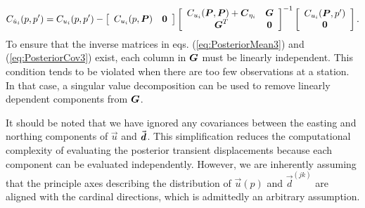 \documentclass[extra,mreferee]{gji}
\begin{document}
\begin{equation}\label{eq:PosteriorCov3}
C_{\post_i}(p,p') = C_{u_i}(p,p') - 
                    \left[\begin{array}{cc}
                          C_{u_i}(p,\points) & \zeros \\
                          \end{array}\right]
                    \left[\begin{array}{cc}
                          C_{u_i}(\points,\points) + \mitbf{C}_{\eta_i} & \G \\
                          \G^T  & \zeros \\
                          \end{array}\right]^{-1}
                    \left[\begin{array}{c}
                          C_{u_i}(\points,p') \\
                          \zeros \\
                          \end{array}\right].
\end{equation}
To ensure that the inverse matrices in eqs. (\ref{eq:PosteriorMean3})
and (\ref{eq:PosteriorCov3}) exist, each column in $\G$ must be
linearly independent. This condition tends to be violated when there
are too few observations at a station. In that case, a singular value
decomposition can be used to remove linearly dependent components from
$\G$.


It should be noted that we have ignored any covariances between the
easting and northing components of $\vec{u}$ and $\vec{\data}$.
This simplification reduces the computational complexity of evaluating
the posterior transient displacements because each component can be
evaluated independently. However, we are inherently assuming that the
principle axes describing the distribution of $\vec{u}(p)$ and
$\vec{d}^{(jk)}$ are aligned with the cardinal directions, which is
admittedly an arbitrary assumption.

\end{document}
